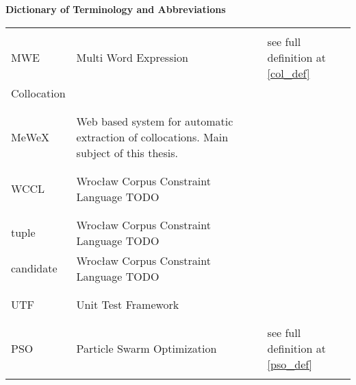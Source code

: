 \textbf{\LARGE Dictionary of Terminology and Abbreviations}

\vspace{1cm}

{\centering
\begin{tabular*}{\textwidth}{L{0.2\textwidth} L{0.5\textwidth} L{0.25\textwidth}}%
    \hline \\
    MWE & Multi Word Expression & see full definition at \ref{col_def}\\
    Collocation &  \\
    \\ \hline \\
    MeWeX & Web based system for automatic extraction of collocations. Main subject of this thesis. \\
    \\ \hline \\
    WCCL & Wrocław Corpus Constraint Language TODO \\
    \\ \hline \\
    tuple & Wrocław Corpus Constraint Language TODO \\
    candidate & Wrocław Corpus Constraint Language TODO \\
    \\ \hline \\
    UTF & Unit Test Framework \\
    \\ \hline \\
    PSO & Particle Swarm Optimization & see full definition at \ref{pso_def}\\
    \\\hline
\end{tabular*} }
    
